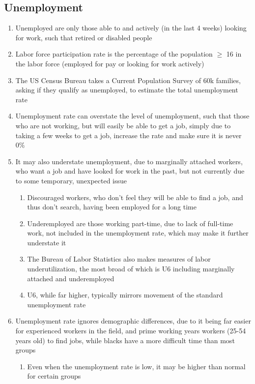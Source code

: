 \documentclass[11 pt, twoside]{article}
\begin{document}
\subsection{Unemployment}
\begin{enumerate}
\item Unemployed are only those able to and actively (in the last 4 weeks) looking for work, such that retired or disabled people
\item Labor force participation rate is the percentage of the population $\geq$ 16 in the labor force (employed for pay or looking for work actively)
\item The US Census Bureau takes a Current Population Survey of 60k families, asking if they qualify as unemployed, to estimate the total unemployment rate
\item Unemployment rate can overstate the level of unemployment, such that those who are not working, but will easily be able to get a job, simply due to taking a few weeks to get a job, increase the rate and make sure it is never 0\%
\item It may also understate unemployment, due to marginally attached workers, who want a job and have looked for work in the past, but not currently due to some temporary, unexpected issue
\begin{enumerate}
\item Discouraged workers, who don't feel they will be able to find a job, and thus don't search, having been employed for a long time
\item Underemployed are those working part-time, due to lack of full-time work, not included in the unemployment rate, which may make it further understate it
\item The Bureau of Labor Statistics also makes measures of labor underutilization, the most broad of which is U6 including marginally attached and underemployed
\item U6, while far higher, typically mirrors movement of the standard unemployment rate
\end{enumerate}
\item Unemployment rate ignores demographic differences, due to it being far easier for experienced workers in the field, and prime working years workers (25-54 years old) to find jobs, while blacks have a more difficult time than most groups
\begin{enumerate}
\item Even when the unemployment rate is low, it may be higher than normal for certain groups
\end{enumerate}

\end{enumerate}
\end{document}
